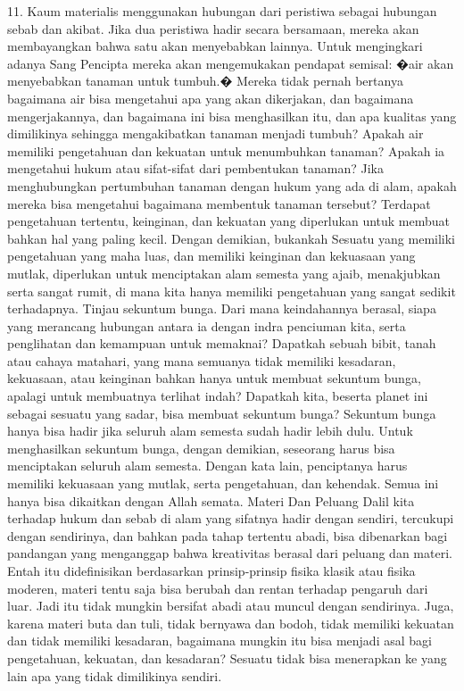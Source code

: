 \documentclass[]{article}
\begin{document}
11. Kaum materialis menggunakan hubungan dari peristiwa sebagai hubungan sebab dan akibat. Jika dua peristiwa  hadir secara bersamaan, mereka akan membayangkan bahwa satu akan menyebabkan lainnya. Untuk mengingkari adanya Sang Pencipta mereka akan mengemukakan pendapat semisal: �air akan menyebabkan tanaman untuk tumbuh.� Mereka tidak pernah bertanya bagaimana air bisa mengetahui apa yang akan dikerjakan, dan bagaimana mengerjakannya, dan bagaimana ini bisa menghasilkan itu, dan apa kualitas yang dimilikinya sehingga mengakibatkan tanaman menjadi tumbuh?
Apakah air memiliki pengetahuan dan kekuatan untuk menumbuhkan tanaman? Apakah ia mengetahui hukum atau sifat-sifat dari pembentukan tanaman? Jika menghubungkan pertumbuhan tanaman dengan hukum yang ada di alam, apakah mereka bisa mengetahui bagaimana membentuk tanaman tersebut? Terdapat pengetahuan tertentu, keinginan, dan kekuatan  yang diperlukan untuk membuat bahkan hal yang paling kecil. Dengan demikian, bukankah Sesuatu yang memiliki pengetahuan yang maha luas, dan memiliki keinginan dan kekuasaan yang mutlak, diperlukan untuk menciptakan alam semesta yang ajaib, menakjubkan serta sangat rumit, di mana kita hanya memiliki pengetahuan yang sangat sedikit terhadapnya. 
Tinjau sekuntum bunga. Dari mana keindahannya berasal, siapa yang merancang hubungan antara ia dengan indra penciuman kita, serta penglihatan dan kemampuan untuk memaknai? Dapatkah sebuah bibit, tanah atau cahaya matahari, yang mana semuanya tidak memiliki kesadaran, kekuasaan, atau keinginan bahkan hanya untuk membuat sekuntum bunga, apalagi untuk membuatnya terlihat indah? Dapatkah kita, beserta planet ini sebagai sesuatu yang sadar, bisa membuat sekuntum bunga? Sekuntum bunga hanya bisa hadir jika seluruh alam semesta sudah hadir lebih dulu. Untuk menghasilkan sekuntum bunga, dengan demikian, seseorang harus bisa menciptakan seluruh alam semesta. Dengan kata lain,  penciptanya harus memiliki kekuasaan yang mutlak, serta pengetahuan, dan kehendak. Semua ini hanya bisa dikaitkan dengan Allah semata. 
Materi Dan Peluang
Dalil kita terhadap hukum dan sebab di alam yang sifatnya hadir  dengan sendiri, tercukupi dengan sendirinya, dan bahkan pada tahap tertentu abadi, bisa dibenarkan bagi pandangan yang menganggap bahwa kreativitas berasal dari peluang dan materi. 
Entah itu didefinisikan berdasarkan prinsip-prinsip fisika klasik atau fisika moderen, materi tentu saja bisa berubah dan rentan terhadap pengaruh dari luar. Jadi itu tidak mungkin bersifat abadi atau muncul dengan sendirinya.  Juga, karena materi buta dan tuli, tidak bernyawa dan bodoh, tidak memiliki kekuatan dan tidak memiliki kesadaran, bagaimana mungkin itu bisa menjadi asal bagi pengetahuan, kekuatan, dan kesadaran? Sesuatu tidak bisa menerapkan ke yang lain apa yang tidak dimilikinya sendiri. 
\end{document}
